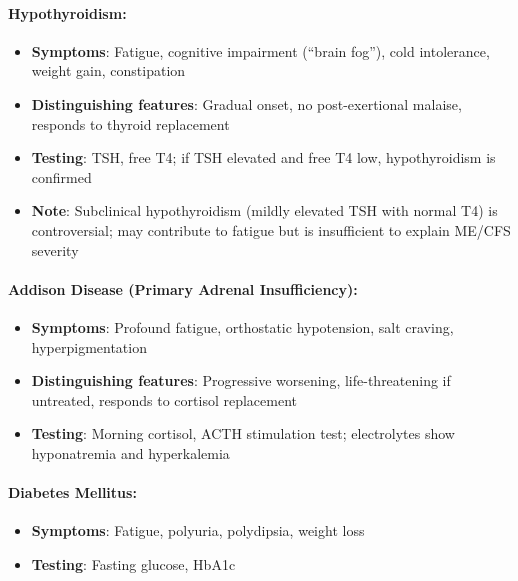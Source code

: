\begin{requirement}
\label{req:endocrine-exclusions}

\paragraph{Hypothyroidism:}
\begin{itemize}
    \item \textbf{Symptoms}: Fatigue, cognitive impairment (``brain fog''), cold intolerance, weight gain, constipation
    \item \textbf{Distinguishing features}: Gradual onset, no post-exertional malaise, responds to thyroid replacement
    \item \textbf{Testing}: TSH, free T4; if TSH elevated and free T4 low, hypothyroidism is confirmed
    \item \textbf{Note}: Subclinical hypothyroidism (mildly elevated TSH with normal T4) is controversial; may contribute to fatigue but is insufficient to explain ME/CFS severity
\end{itemize}

\paragraph{Addison Disease (Primary Adrenal Insufficiency):}
\begin{itemize}
    \item \textbf{Symptoms}: Profound fatigue, orthostatic hypotension, salt craving, hyperpigmentation
    \item \textbf{Distinguishing features}: Progressive worsening, life-threatening if untreated, responds to cortisol replacement
    \item \textbf{Testing}: Morning cortisol, ACTH stimulation test; electrolytes show hyponatremia and hyperkalemia
\end{itemize}

\paragraph{Diabetes Mellitus:}
\begin{itemize}
    \item \textbf{Symptoms}: Fatigue, polyuria, polydipsia, weight loss
    \item \textbf{Testing}: Fasting glucose, HbA1c
\end{itemize}
\end{requirement}

